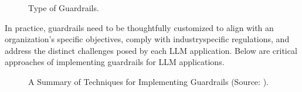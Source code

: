 \documentclass[letterpaper,11pt,english]{sphinxmanual}
\begin{document}
\begin{figure}[htbp]
\centering
\capstart

\noindent{}
\caption{Type of Guardrails.}\label{\detokenize{guardrails:id7}}\end{figure}

\sphinxAtStartPar
In practice, guardrails need to be thoughtfully customized to align with
an organization’s specific objectives, comply with industry\sphinxhyphen{}specific
regulations, and address the distinct challenges posed by each LLM
application. Below are critical approaches of implementing guardrails
for LLM applications.

\begin{figure}[htbp]
\centering
\capstart

\noindent{}
\caption{A Summary of Techniques for Implementing Guardrails (Source: ).}\label{\detokenize{guardrails:id8}}\end{figure}
\end{document}
